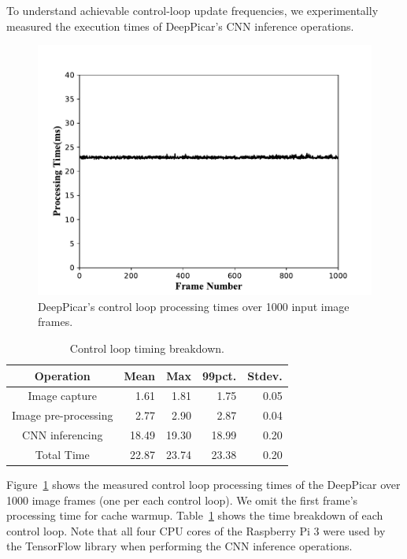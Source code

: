 To understand achievable control-loop update frequencies, we
experimentally measured the execution times of DeepPicar's CNN
inference operations.


\begin{figure}[h]
  \centering
  \includegraphics[width=.45\textwidth]{figs/Fig7_new}
  \caption{DeepPicar's control loop processing times over 1000 input image frames.}
  \label{fig:control-loop-timing}
\end{figure}

\begin{table}[h]
  \centering
  \begin{tabular} {| c | r | r | r | r |}
    \hline
    \textbf{Operation} & \textbf{Mean} & \textbf{Max} &   \textbf{99pct.} & \textbf{Stdev.} \\ \hline
    Image capture        & 1.61  &  1.81 &  1.75  & 0.05 \\ \hline
    Image pre-processing & 2.77  &  2.90 &  2.87  & 0.04 \\ \hline
    CNN inferencing      & 18.49 & 19.30 & 18.99  & 0.20 \\ \hline
    Total Time           & 22.87 & 23.74 & 23.38  & 0.20 \\ \hline
  \end{tabular}
  \caption{Control loop timing breakdown.}
  \label{tbl:control-loop-breakdown}
\end{table}

Figure~\ref{fig:control-loop-timing} shows the measured control loop 
processing times of the DeepPicar over 1000 image frames (one per each
control loop). We omit the first frame's processing time for cache
warmup. Table~\ref{tbl:control-loop-breakdown} shows the time
breakdown of each control loop. Note that all four CPU cores of the
Raspberry Pi 3 were used by the TensorFlow library when performing the
CNN inference operations.

